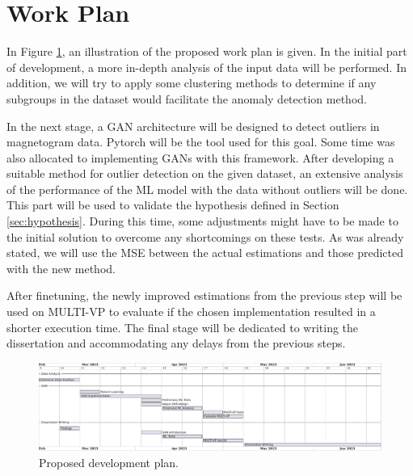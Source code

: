 \section{Work Plan}\label{sec:work_plan}
In Figure \ref{fig:work_plan}, an illustration of the proposed work plan is given. In the initial part of development, a more in-depth analysis of the input data will be performed. In addition, we will try to apply some clustering methods to determine if any subgroups in the dataset would facilitate the anomaly detection method.

In the next stage, a GAN architecture will be designed to detect outliers in magnetogram data. Pytorch \cite{NEURIPS2019_9015} will be the tool used for this goal. Some time was also allocated to implementing GANs with this framework. After developing a suitable method for outlier detection on the given dataset, an extensive analysis of the performance of the ML model with the data without outliers will be done. This part will be used to validate the hypothesis defined in Section \ref{sec:hypothesis}. During this time, some adjustments might have to be made to the initial solution to overcome any shortcomings on these tests. As was already stated, we will use the MSE between the actual estimations and those predicted with the new method. 

After finetuning, the newly improved estimations from the previous step will be used on MULTI-VP to evaluate if the chosen implementation resulted in a shorter execution time. The final stage will be dedicated to writing the dissertation and accommodating any delays from the previous steps.

\begin{figure}[ht]
\centering
\includegraphics[width=\textwidth]{figures/work_plan.pdf}
\caption{Proposed development plan.}
\label{fig:work_plan}
\end{figure}

